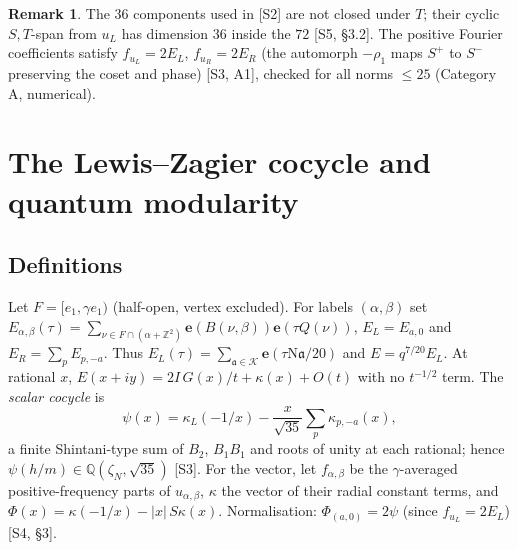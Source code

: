 \documentclass[11pt]{article}
\theoremstyle{definition}
\newtheorem{remark}[theorem]{Remark}
\newcommand{\Q}{\mathbb{Q}}
\newcommand{\Z}{\mathbb{Z}}
\newcommand{\e}{\mathbf{e}}
\newcommand{\K}{\mathcal{K}}
\newcommand{\fa}{\mathfrak{a}}
\newcommand{\Nm}{\mathrm{N}}
\newcommand{\src}[1]{\textup{[S#1]}}
\begin{document}
\begin{remark}
The $36$ components used in \src{2} are not closed under $T$; their cyclic $S,T$-span from $u_L$ has dimension $36$ inside the $72$
\src{5, \S3.2}. The positive Fourier coefficients satisfy $f_{u_L}=2E_L$, $f_{u_R}=2E_R$ (the automorph $-\rho_1$ maps $S^+$ to $S^-$ preserving
the coset and phase) \src{3, A1}, checked for all norms $\le25$ (Category A, numerical).
\end{remark}

\section{The Lewis--Zagier cocycle and quantum modularity}\label{sec:lz}

\subsection{Definitions}
Let $F=[e_1,\gamma e_1)$ (half-open, vertex excluded). For labels $(\alpha,\beta)$ set
$E_{\alpha,\beta}(\tau)=\sum_{\nu\in F\cap(\alpha+\Z^2)}\e(B(\nu,\beta))\e(\tau Q(\nu))$, $E_L=E_{a,0}$ and $E_R=\sum_pE_{p,-a}$.
Thus $E_L(\tau)=\sum_{\fa\in\K}\e(\tau\Nm\fa/20)$ and $E=q^{7/20}E_L$. At rational $x$,
$E(x+iy)=2I\,G(x)/t+\kappa(x)+O(t)$ with no $t^{-1/2}$ term. The \emph{scalar cocycle} is
\[
\psi(x)=\kappa_L(-1/x)-\frac{x}{\sqrt{35}}\sum_p\kappa_{p,-a}(x),
\]
a finite Shintani-type sum of $B_2$, $B_1B_1$ and roots of unity at each rational; hence $\psi(h/m)\in\Q(\zeta_N,\sqrt{35})$ \src{3}.
For the vector, let $f_{\alpha,\beta}$ be the $\gamma$-averaged positive-frequency parts of $u_{\alpha,\beta}$, $\kappa$ the vector of their radial
constant terms, and $\Phi(x)=\kappa(-1/x)-|x|\,S\kappa(x)$. Normalisation: $\Phi_{(a,0)}=2\psi$ (since $f_{u_L}=2E_L$) \src{4, \S3}.
\end{document}
